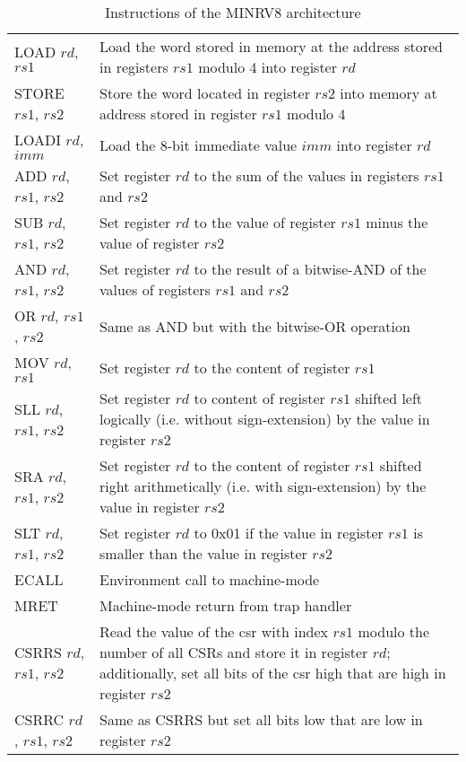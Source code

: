 \begin{table}
    \centering
    \begin{tabular}{|l p{10cm}|}
        \hline
        LOAD $ rd $, $ rs1 $ & Load the word stored in memory at the address stored in registers $ rs1 $ modulo 4 into register $ rd $ \\
        STORE $ rs1 $, $ rs2 $ & Store the word located in register $ rs2 $ into memory at address stored in register $ rs1 $ modulo 4 \\
        LOADI $ rd $, $ imm $ & Load the 8-bit immediate value $ imm $ into register $ rd $ \\
        ADD $ rd $, $ rs1 $, $ rs2 $ & Set register $ rd $ to the sum of the values in registers $ rs1 $ and $ rs2 $ \\
        SUB $ rd $, $ rs1 $, $ rs2 $ & Set register $ rd $ to the value of register $ rs1 $ minus the value of register $ rs2 $ \\
        AND $ rd $, $ rs1 $, $ rs2 $ & Set register $ rd $ to the result of a bitwise-AND of the values of registers $ rs1 $ and $ rs2 $ \\
        OR $ rd $, $ rs1 $, $ rs2 $ & Same as AND but with the bitwise-OR operation \\
        MOV $ rd $, $ rs1 $ & Set register $ rd $ to the content of register $ rs1 $ \\
        SLL $ rd $, $ rs1 $, $ rs2 $ & Set register $ rd $ to content of register $ rs1 $ shifted left logically (i.e. without sign-extension) by the value in register $ rs2 $ \\
        SRA $ rd $, $ rs1 $, $ rs2 $ & Set register $ rd $ to the content of register $ rs1 $ shifted right arithmetically (i.e. with sign-extension) by the value in register $ rs2 $ \\
        SLT $ rd $, $ rs1 $, $ rs2 $ & Set register $ rd $ to 0x01 if the value in register $ rs1 $ is smaller than the value in register $ rs2 $ \\
        ECALL & Environment call to machine-mode \\
        MRET & Machine-mode return from trap handler \\
        CSRRS $ rd $, $ rs1 $, $ rs2 $ & Read the value of the \gls{csr} with index $ rs1 $ modulo the number of all CSRs and store it in register $ rd $; additionally, set all bits of the \gls{csr} high that are high in register $ rs2 $ \\
        CSRRC $ rd $, $ rs1 $, $ rs2 $ & Same as CSRRS but set all bits low that are low in register $ rs2 $ \\
        \hline
    \end{tabular}
    \caption{Instructions of the MINRV8 architecture}
    \label{tbl:min-arch-instrs}
\end{table}

